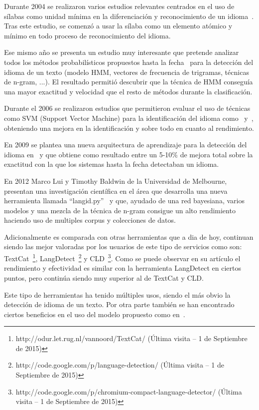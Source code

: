 \documentclass[runningheads,a4paper]{llncs}
\theoremstyle{break}
\begin{document}
\newpage

Durante 2004 se realizaron varios estudios relevantes centrados en el uso de sílabas como unidad mínima en la diferenciación y reconocimiento de un idioma~\cite{lid:6}. Tras este estudio, se comenzó a usar la sílaba como un elemento atómico y mínimo en todo proceso de reconocimiento del idioma. 

Ese mismo año se presenta un estudio muy interesante que pretende analizar todos los métodos probabilísticos propuestos hasta la fecha~\cite{lid:7} para la detección del idioma de un texto (modelo HMM, vectores de frecuencia de trigramas, técnicas de n-gram, ...). El resultado permitió descubrir que la técnica de HMM conseguía una mayor exactitud y velocidad que el resto de métodos durante la clasificación.

Durante el 2006 se realizaron estudios que permitieron evaluar el uso de técnicas como SVM (Support Vector Machine) para la identificación del idioma como~\cite{lid:8} y~\cite{lid:9}, obteniendo una mejora en la identificación y sobre todo en cuanto al rendimiento.

En 2009 se plantea una nueva arquitectura de aprendizaje para la detección del idioma en~\cite{lid:10} y que obtiene como resultado entre un 5-10\% de mejora total sobre la exactitud con la que los sistemas hasta la fecha detectaban un idioma.

En 2012 Marco Lui y Timothy Baldwin de la Universidad de Melbourne, presentan una investigación científica en el área que desarrolla una nueva herramienta llamada ``langid.py''~\cite{lid:11} y que, ayudado de una red bayesiana, varios modelos y una mezcla de la técnica de n-gram consigue un alto rendimiento haciendo uso de multiples corpus y colecciones de datos. 

Adicionalmente es comparada con otras herramientas que a dia de hoy, continuan siendo las mejor valoradas por los usuarios de este tipo de servicios como son: TextCat~\footnote{http://odur.let.rug.nl/vannoord/TextCat/ (Última visita -- 1 de Septiembre de 2015)}, LangDetect~\footnote{http://code.google.com/p/language-detection/ (Última visita -- 1 de Septiembre de 2015)} y CLD~\footnote{http://code.google.com/p/chromium-compact-language-detector/ (Última visita -- 1 de Septiembre de 2015)}. Como se puede observar en su artículo el rendimiento y efectividad es similar con la herramienta LangDetect en ciertos puntos, pero continúa siendo muy superior al de TextCat y CLD.

Este tipo de herramientas ha tenido múltiples usos, siendo el más obvio la detección de idioma de un texto. Por otra parte también se han encontrado ciertos beneficios en el uso del modelo propuesto como en~\cite{lid:12}.
\end{document}
